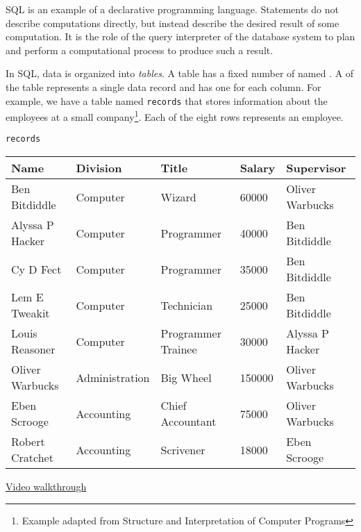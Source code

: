 SQL is an example of a declarative programming language. Statements do not
describe computations directly, but instead describe the desired result of some
computation. It is the role of the query interpreter of the database system to
plan and perform a computational process to produce such a result.

In SQL, data is organized into \textit{tables}.  A table has a fixed number of
named . A  of the table represents a single data
record and has one  for each column.  For example, we have a table
named \texttt{records} that stores information about the employees at a small
company\footnote{Example adapted from Structure and Interpretation of Computer
Programs}. Each of the eight rows represents an employee.

\begin{center}
    \texttt{records}\\
    \begin{tabular}{ l l l l l }
        \textbf{Name} & \textbf{Division} & \textbf{Title} & \textbf{Salary} & \textbf{Supervisor} \\
        \hline
        Ben Bitdiddle   &  Computer       & Wizard             & 60000  & Oliver Warbucks \\
        Alyssa P Hacker &  Computer       & Programmer         & 40000  & Ben Bitdiddle   \\
        Cy D Fect       &  Computer       & Programmer         & 35000  & Ben Bitdiddle   \\
        Lem E Tweakit   &  Computer       & Technician         & 25000  & Ben Bitdiddle   \\
        Louis Reasoner  &  Computer       & Programmer Trainee & 30000  & Alyssa P Hacker \\
        Oliver Warbucks &  Administration & Big Wheel          & 150000 & Oliver Warbucks \\
        Eben Scrooge    &  Accounting     & Chief Accountant   & 75000  & Oliver Warbucks \\
        Robert Cratchet &  Accounting     & Scrivener          & 18000  & Eben Scrooge
    \end{tabular}
\end{center}
\begin{solution}[0.1in]
\href{https://youtu.be/OyTnjS94EE8}{Video walkthrough}
\end{solution}
